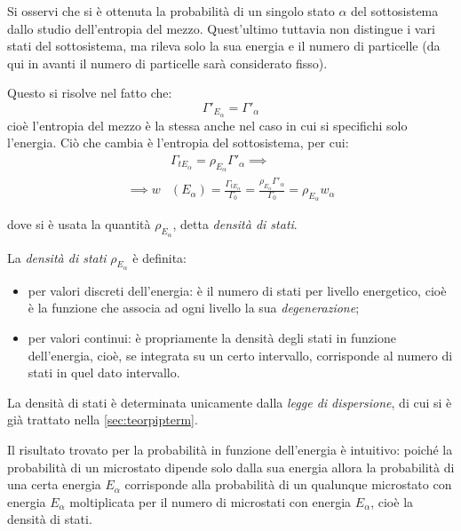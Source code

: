 Si osservi che si è ottenuta la probabilità di un singolo stato $\alpha$ del sottosistema dallo studio dell'entropia del mezzo. Quest'ultimo tuttavia non distingue i vari stati del sottosistema, ma rileva solo la sua energia e il numero di particelle (da qui in avanti il numero di particelle sarà considerato fisso).

Questo si risolve nel fatto che:
\begin{equation*}
\Gamma'_{E_\alpha} = \Gamma'_\alpha
\end{equation*}
\noindent cioè l'entropia del mezzo è la stessa anche nel caso in cui si specifichi solo l'energia. Ciò che cambia è l'entropia del sottosistema, per cui:
\begin{align*}
&\Gamma_{tE_\alpha} = \rho_{E_\alpha} \Gamma'_\alpha \implies \\
\implies w&(E_\alpha) = \frac{\Gamma_{tE_\alpha}}{\Gamma_0} = \frac{\rho_{E_\alpha} \Gamma'_\alpha}{\Gamma_0} = \rho_{E_\alpha} w_\alpha
\end{align*}

\noindent dove si è usata la quantità $\rho_{E_\alpha}$, detta \textit{densità di stati}.

\begin{defn}
	\label{def:statdens}
	La \textit{densità di stati} $\rho_{E_\alpha}$ è definita:
	\begin{itemize}
		\item per valori discreti dell'energia: è il numero di stati per livello energetico, cioè è la funzione che associa ad ogni livello la sua \textit{degenerazione};
		\item per valori continui: è propriamente la densità degli stati in funzione dell'energia, cioè, se integrata su un certo intervallo, corrisponde al numero di stati in quel dato intervallo.
	\end{itemize}
\end{defn}

\noindent La densità di stati è determinata unicamente dalla \textit{legge di dispersione}, di cui si è già trattato nella \cref{sec:teorpipterm}.

Il risultato trovato per la probabilità in funzione dell'energia è intuitivo: poiché la probabilità di un microstato dipende solo dalla sua energia allora la probabilità di una certa energia $E_\alpha$ corrisponde alla probabilità di un qualunque microstato con energia $E_\alpha$ moltiplicata per il numero di microstati con energia $E_\alpha$, cioè la densità di stati.

